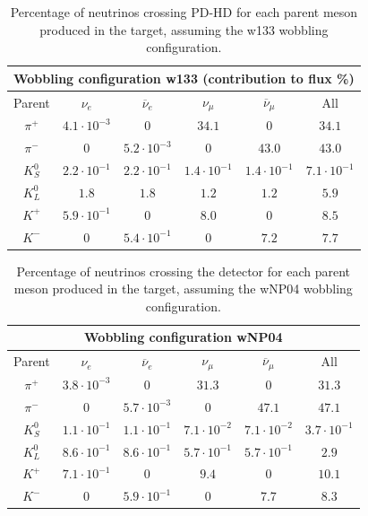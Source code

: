 \begin{table}[h]
\centering
\begin{tabular}{|c|c|c|c|c|c|}
\hline
\multicolumn{6}{|c|}{Wobbling configuration w133 (contribution to flux \%)}\\
\hline
\hline
Parent & $\nu_e$ & $\overline{\nu}_e$ & $\nu_\mu$ & $\overline{\nu}_\mu$ & All \\
\hline
$\pi^+$ & $4.1 \cdot 10^{-3}$ & $0$ & $34.1$ & $0$ & $34.1$ \\ 
$\pi^-$ & $0$ & $5.2 \cdot 10^{-3}$ & $0$ & $43.0$ & $43.0$ \\ 
$K^0_S$ & $2.2 \cdot 10^{-1}$ & $2.2 \cdot 10^{-1}$ & $1.4 \cdot 10^{-1}$ & $1.4 \cdot 10^{-1}$ & $7.1 \cdot 10^{-1}$ \\ 
$K^0_L$ & $1.8$ & $1.8$ & $1.2$ & $1.2$ & $5.9$ \\ 
$K^+$ & $5.9 \cdot 10^{-1}$ & $0$ & $8.0$ & $0$ & $8.5$ \\ 
$K^-$ & $0$ & $5.4 \cdot 10^{-1}$ & $0$ & $7.2$ & $7.7$ \\ 
\hline
\end{tabular}
\caption{Percentage of neutrinos crossing PD-HD for each parent meson produced in the target, assuming the w133 wobbling configuration.}
\label{tab:light_nu_w133}
\end{table}

\begin{table}[h]
\centering
\begin{tabular}{|c|c|c|c|c|c|}
\hline
\multicolumn{6}{|c|}{Wobbling configuration wNP04}\\
\hline
\hline
Parent & $\nu_e$ & $\overline{\nu}_e$ & $\nu_\mu$ & $\overline{\nu}_\mu$ & All \\
\hline
$\pi^+$ & $3.8\cdot 10^{-3}$ & $0$ & $31.3$ & $0$ & $31.3$ \\ 
$\pi^-$ & 0 & $5.7\cdot 10^{-3}$ & $0$ & $47.1$ & $47.1$ \\ 
$K^0_S$ & $1.1\cdot 10^{-1}$ & $1.1 \cdot 10^{-1}$ & $7.1 \cdot 10^{-2}$ & $7.1 \cdot 10^{-2}$ & $3.7 \cdot 10^{-1}$ \\ 
$K^0_L$ & $8.6\cdot 10^{-1}$ & $8.6 \cdot 10^{-1}$ & $5.7 \cdot 10^{-1}$ & $5.7 \cdot 10^{-1}$ & $2.9$ \\ 
$K^+$ & $7.1\cdot 10^{-1}$ & $0$ & $9.4$ & $0$ & $10.1$ \\ 
$K^-$ & $0$ & $5.9\cdot 10^{-1}$ & $0$ & $7.7$ & $8.3$ \\ 
\hline
\end{tabular}
\caption{Percentage of neutrinos crossing the detector for each parent meson produced in the target, assuming the wNP04 wobbling configuration.}
\label{tab:light_nu_wnp04}
\end{table}


